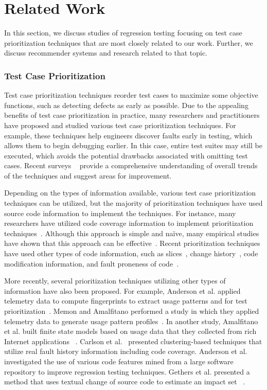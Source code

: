 \section{Related Work}
\label{sec:related-work}

In this section, we discuss studies of  regression testing focusing on 
test case prioritization techniques that are most closely 
related to our work. Further, we discuss recommender systems 
and research related to that topic.

\subsubsection*{Test Case Prioritization}
Test case prioritization techniques reorder test cases to maximize
some objective functions, such as detecting defects as early as possible.
Due to the appealing benefits of test case prioritization in practice, 
many researchers and practitioners
have proposed and studied various test case prioritization 
techniques. For example, these techniques help engineers discover faults
early in testing, which allows them to begin debugging earlier.
In this case, entire test suites may still be executed, which avoids 
the potential drawbacks associated with omitting test cases. 
Recent surveys ~\cite{catal13, marksurvey} provide a comprehensive 
understanding of overall trends of the techniques and suggest areas for improvement.

Depending on the types of information available, various test case
prioritization techniques can be utilized, but 
the majority of prioritization techniques have used source code
information to implement the techniques.
For instance, many researchers have utilized code coverage information
to implement prioritization techniques~\cite{elbaum02feb, kim02may,rothermel01oct}. Although this approach is simple and na\"ive, many empirical
studies have shown that this approach can be effective~\cite{cost3, 
	cost1, Malishevsky02, myra}.
Recent prioritization techniques have used other
types of code information, such as slices~\cite{jeffrey06sep}, change
history~\cite{sherriff07}, code modification information, and fault
proneness of code~\cite{mirarab07}.

More recently, several prioritization techniques 
utilizing other types of information have also been proposed. 
For example, Anderson et al.  applied telemetry data to compute fingerprints 
to extract usage patterns and for test prioritization~\cite{jeff16}.
Memon and Amalfitano performed a study in which they applied telemetry 
data to generate usage pattern profiles~\cite{memongui}.  
In another study, Amalfitano et al. built finite state models
based on usage data that they collected from rich Internet applications ~\cite{rich}. 
Carlson et al.~\cite{ryan} presented clustering-based techniques that
utilize real fault history information including code coverage.
Anderson et al.~\cite{jeff14} investigated the use of various code features
mined from a large software repository to improve regression testing techniques.
Gethers et al. presented a method  that uses textual change of source code
to estimate an impact set ~\cite{kagdichange}. 

